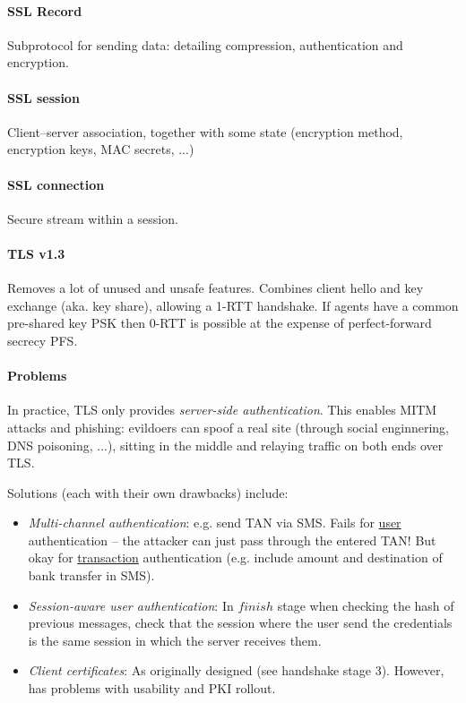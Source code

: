 \paragraph{SSL Record} Subprotocol for sending data: detailing compression, authentication and encryption.

\paragraph{SSL session} Client--server association, together with some state (encryption method, encryption keys, MAC secrets, ...)

\paragraph{SSL connection} Secure stream within a session.

\paragraph{TLS v1.3} Removes a lot of unused and unsafe features. Combines client hello and key exchange (aka. key share), allowing a 1-RTT handshake. If agents have a common pre-shared key PSK then 0-RTT is possible at the expense of perfect-forward secrecy PFS.

\paragraph{Problems} In practice, TLS only provides \emph{server-side authentication}. This enables MITM attacks and phishing: evildoers can spoof a real site (through social enginnering, DNS poisoning, ...), sitting in the middle and relaying traffic on both ends over TLS.

Solutions (each with their own drawbacks) include:

\begin{itemize}
    \item \emph{Multi-channel authentication}: e.g. send TAN via SMS. Fails for \underline{user} authentication -- the attacker can just pass through the entered TAN! But okay for \underline{transaction} authentication (e.g. include amount and destination of bank transfer in SMS).
    \item \emph{Session-aware user authentication}: In $finish$ stage when checking the hash of previous messages, check that the session where the user send the credentials is the same session in which the server receives them.
    \item \emph{Client certificates}: As originally designed (see handshake stage 3). However, has problems with usability and PKI rollout.
\end{itemize}



